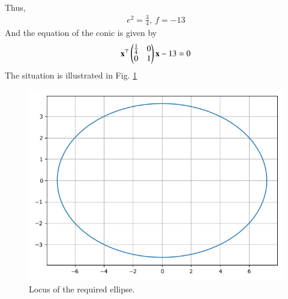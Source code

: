 \documentclass[journal,12pt,twocolumn]{IEEEtran}
\renewcommand{\vec}[1]{\boldsymbol{\mathbf{#1}}}
\begin{document}
\begin{enumerate}
\begin{align}
    \end{align}
    Thus,
    \begin{align}
        e^2 = \frac{3}{4},\ f = -13
    \end{align}
    And the equation of the conic is given by
    \begin{align}
        \vec{x}^\top\myvec{\frac{1}{4}&0\\0&1}\vec{x} - 13 = 0
    \end{align}
    The situation is illustrated in Fig. \ref{fig:ellipse}
    \begin{figure}[!ht]
        \centering
        \includegraphics[width=\columnwidth]{figs/ellipse.png}
        \caption{Locus of the required ellipse.}
        \label{fig:ellipse}
    \end{figure}
\end{enumerate}
\end{document}
